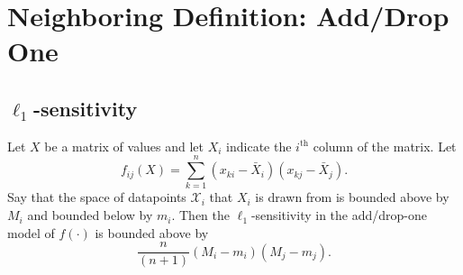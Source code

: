 \documentclass[11pt]{scrartcl} %
\begin{document}
\section{Neighboring Definition: Add/Drop One}
\subsection{$\ell_1$-sensitivity}

\begin{theorem}
Let $X$ be a matrix of values and let $X_i$ indicate the $i^{\text{th}}$ column of the matrix. Let
$$ f_{ij} (X)= \sum_{k=1}^n (x_{ki} - \bar{X}_i)(x_{kj} - \bar{X}_j).$$
Say that the space of datapoints $\mathcal{X}_i$ that $X_i$ is drawn from is bounded above by $M_i$ and bounded below by $m_i$. Then the $\ell_1$-sensitivity in the add/drop-one model of $f(\cdot)$ is bounded above by
 $$ \frac{n}{(n+1)}  (M_i - m_i)(M_j - m_j).$$ 
\end{theorem}
\end{document}
